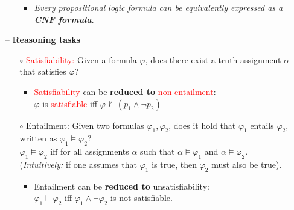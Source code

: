 \begin{itemize}
\begin{itemize}
\begin{itemize}
            \item \textit{Every propositional logic formula can be equivalently expressed as a \textbf{CNF formula}}.
        \end{itemize}
    \end{itemize}
    \item[--] \textbf{Reasoning tasks}
    \begin{itemize}
        \item[$\circ$] \textcolor{red}{Satisfiability:}
        Given a formula $\varphi$, does there exist a truth assignment $\alpha$ that satisfies $\varphi$?
        \begin{itemize}
            \item \textcolor{red}{Satisfiability} can be \textbf{reduced to} \textcolor{red}{non-entailment}: \\
            $\varphi$ is \textcolor{red}{satisfiable} iff $\varphi \not \models (p_1 \wedge \neg p_2)$
        \end{itemize}
        \item[$\circ$] \textcolor{NavyBlue}{Entailment:}
        Given two formulas $\varphi_1, \varphi_2$, does it hold that $\varphi_1$ entails $\varphi_2$, written as $\varphi_1 \models \varphi_2$? \\
        
        $\varphi_1 \models \varphi_2$ iff for all assignments $\alpha$ such that $\alpha \models \varphi_1$ and $\alpha \models \varphi_2$. \\
        (\textit{Intuitively:} if one assumes that $\varphi_1$ is true, then $\varphi_2$ must also be true).
        \begin{itemize}
            \item \textcolor{NavyBlue}{Entailment} can be \textbf{reduced to} \textcolor{NavyBlue}{unsatisfiability}: \\
            $\varphi_1 \models \varphi_2$ iff $\varphi_1 \wedge \neg \varphi_2$ is \textcolor{NavyBlue}{not satisfiable}.
        \end{itemize}
    \end{itemize}
\end{itemize}

\vspace{1cm}
